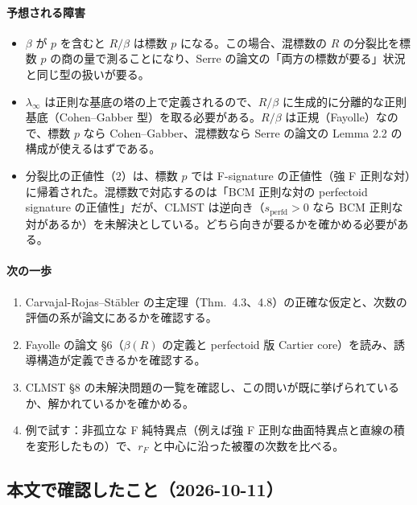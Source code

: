 \documentclass[11pt,a4paper]{ltjsarticle}
\theoremstyle{plain}
\theoremstyle{definition}
\theoremstyle{remark}
\theoremstyle{plain}
\begin{document}
\paragraph{予想される障害}
\begin{itemize}
  \item $\beta$ が $p$ を含むと $R/\beta$ は標数 $p$ になる。この場合、混標数の $R$ の分裂比を標数 $p$ の商の量で測ることになり、Serre の論文の「両方の標数が要る」状況と同じ型の扱いが要る。
  \item $\lambda_\infty$ は正則な基底の塔の上で定義されるので、$R/\beta$ に生成的に分離的な正則基底（Cohen--Gabber 型）を取る必要がある。$R/\beta$ は正規（Fayolle）なので、標数 $p$ なら Cohen--Gabber、混標数なら Serre の論文の Lemma 2.2 の構成が使えるはずである。
  \item 分裂比の正値性（2）は、標数 $p$ では F-signature の正値性（強 F 正則な対）に帰着された。混標数で対応するのは「BCM 正則な対の perfectoid signature の正値性」だが、CLMST は逆向き（$s_{\mathrm{perfd}}>0$ なら BCM 正則な対があるか）を未解決としている。どちら向きが要るかを確かめる必要がある。
\end{itemize}

\paragraph{次の一歩}
\begin{enumerate}
  \item Carvajal-Rojas--Stäbler の主定理（Thm.~4.3、4.8）の正確な仮定と、次数の評価の系が論文にあるかを確認する。
  \item Fayolle の論文 §6（$\beta(R)$ の定義と perfectoid 版 Cartier core）を読み、誘導構造が定義できるかを確認する。
  \item CLMST §8 の未解決問題の一覧を確認し、この問いが既に挙げられているか、解かれているかを確かめる。
  \item 例で試す：非孤立な F 純特異点（例えば強 F 正則な曲面特異点と直線の積を変形したもの）で、$r_F$ と中心に沿った被覆の次数を比べる。
\end{enumerate}

\subsection{本文で確認したこと（2026-10-11）}
\end{document}
